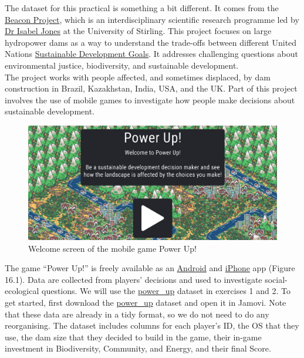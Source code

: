 \documentclass[
]{scrbook}
\begin{document}
The dataset for this practical is something a bit different.
It comes from the \href{https://www.thebeaconproject.net/}{Beacon Project}, which is an interdisciplinary scientific research programme led by \href{https://www.stir.ac.uk/people/256518}{Dr Isabel Jones} at the University of Stirling.
This project focuses on large hydropower dams as a way to understand the trade-offs between different United Nations \href{https://sdgs.un.org/goals}{Sustainable Development Goals}.
It addresses challenging questions about environmental justice, biodiversity, and sustainable development.\\
The project works with people affected, and sometimes displaced, by dam construction in Brazil, Kazakhstan, India, USA, and the UK.
Part of this project involves the use of mobile games to investigate how people make decisions about sustainable development.

\begin{figure}
\includegraphics[width=0.8\linewidth]{img/power_up} \caption{Welcome screen of the mobile game Power Up!}\label{fig:unnamed-chunk-66}
\end{figure}

The game ``Power Up!'' is freely available as an \href{https://play.google.com/store/apps/details?id=com.hyperluminal.stirlinguniversity.sustainabledevelopmentgame}{Android} and \href{https://apps.apple.com/gb/app/power-up/id1585634888}{iPhone} app (Figure 16.1).
Data are collected from players' decisions and used to investigate social-ecological questions.
We will use the \href{https://raw.githubusercontent.com/bradduthie/statistical_techniques/main/data/power_up.csv}{power\_up} dataset in exercises 1 and 2.
To get started, first download the \href{https://raw.githubusercontent.com/bradduthie/statistical_techniques/main/data/power_up.csv}{power\_up} dataset and open it in Jamovi.
Note that these data are already in a tidy format, so we do not need to do any reorganising.
The dataset includes columns for each player's ID, the OS that they use, the dam size that they decided to build in the game, their in-game investment in Biodiversity, Community, and Energy, and their final Score.
\end{document}
